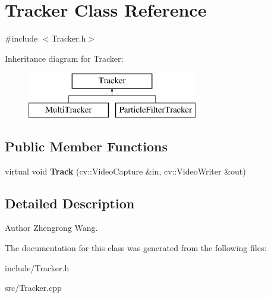 \hypertarget{classTracker}{}\section{Tracker Class Reference}
\label{classTracker}


{\ttfamily \#include $<$Tracker.\+h$>$}

Inheritance diagram for Tracker\+:\begin{figure}[H]
\begin{center}
\leavevmode
\includegraphics[height=2.000000cm]{classTracker}
\end{center}
\end{figure}
\subsection*{Public Member Functions}
\begin{DoxyCompactItemize}
\item 
\hypertarget{classTracker_a6a0cf926781c2d5706be0aa05a608a93}{}virtual void {\bfseries Track} (cv\+::\+Video\+Capture \&in, cv\+::\+Video\+Writer \&out)\label{classTracker_a6a0cf926781c2d5706be0aa05a608a93}

\end{DoxyCompactItemize}


\subsection{Detailed Description}
\begin{DoxyAuthor}{Author}
Zhengrong Wang. 
\end{DoxyAuthor}


The documentation for this class was generated from the following files\+:\begin{DoxyCompactItemize}
\item 
include/Tracker.\+h\item 
src/Tracker.\+cpp\end{DoxyCompactItemize}
